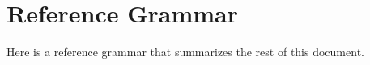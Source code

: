 \chapter{Reference Grammar}
\label{cha:reference}

Here is a reference grammar that summarizes the rest of this document.
